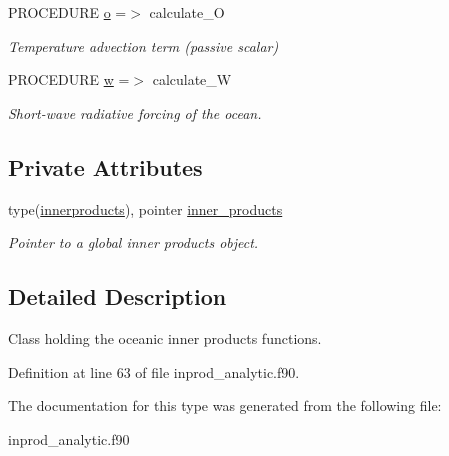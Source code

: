 \begin{DoxyCompactItemize}
\mbox{\label{structinprod__analytic_1_1oceaninnerproducts_acf470fb66c8ac2447a5d990e42bf80e3}} 
P\+R\+O\+C\+E\+D\+U\+RE \hyperlink{structinprod__analytic_1_1oceaninnerproducts_acf470fb66c8ac2447a5d990e42bf80e3}{o} =$>$ calculate\+\_\+O
\begin{DoxyCompactList}\small\item\em Temperature advection term (passive scalar) \end{DoxyCompactList}\item 
\mbox{\label{structinprod__analytic_1_1oceaninnerproducts_a78e1d5f25691085731fc0c1859729e73}} 
P\+R\+O\+C\+E\+D\+U\+RE \hyperlink{structinprod__analytic_1_1oceaninnerproducts_a78e1d5f25691085731fc0c1859729e73}{w} =$>$ calculate\+\_\+W
\begin{DoxyCompactList}\small\item\em Short-\/wave radiative forcing of the ocean. \end{DoxyCompactList}\end{DoxyCompactItemize}
\subsection*{Private Attributes}
\begin{DoxyCompactItemize}
\item 
\mbox{\label{structinprod__analytic_1_1oceaninnerproducts_a7500d80ced60b14563bdf7697eea45c6}} 
type(\hyperlink{structinprod__analytic_1_1innerproducts}{innerproducts}), pointer \hyperlink{structinprod__analytic_1_1oceaninnerproducts_a7500d80ced60b14563bdf7697eea45c6}{inner\+\_\+products}
\begin{DoxyCompactList}\small\item\em Pointer to a global inner products object. \end{DoxyCompactList}\end{DoxyCompactItemize}


\subsection{Detailed Description}
Class holding the oceanic inner products functions. 

Definition at line 63 of file inprod\+\_\+analytic.\+f90.



The documentation for this type was generated from the following file\+:\begin{DoxyCompactItemize}
\item 
inprod\+\_\+analytic.\+f90\end{DoxyCompactItemize}
